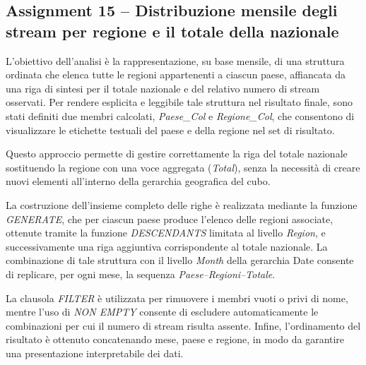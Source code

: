 \subsection*{Assignment 15 -- Distribuzione mensile degli stream per regione e il totale della nazionale}

L’obiettivo dell'analisi è la rappresentazione, su base mensile, di una struttura ordinata che
elenca tutte le regioni appartenenti a ciascun paese, affiancata da una riga
di sintesi per il totale nazionale e del relativo numero di
stream osservati. Per rendere esplicita e leggibile tale struttura nel risultato
finale, sono stati definiti due membri calcolati,
\textit{Paese\_Col} e \textit{Regione\_Col}, che consentono di visualizzare
 le etichette testuali del paese e della regione nel set di risultato.

Questo approccio permette di gestire correttamente la riga del totale
nazionale sostituendo la regione con una voce aggregata (\textit{Total}), senza
la necessità di creare nuovi elementi all’interno della gerarchia geografica del
cubo.

La costruzione dell’insieme completo delle righe è realizzata mediante la funzione
\textit{GENERATE}, che per ciascun paese produce l’elenco delle regioni
associate, ottenute tramite la funzione \textit{DESCENDANTS} limitata al livello
\textit{Region}, e successivamente una riga aggiuntiva corrispondente al totale
nazionale. La combinazione di tale struttura con il livello \textit{Month} della
gerarchia Date consente di replicare, per ogni mese, la sequenza
\emph{Paese–Regioni–Totale}.

La clausola \textit{FILTER} è utilizzata per rimuovere i membri vuoti o
privi di nome, mentre l’uso di \textit{NON EMPTY} consente di escludere
automaticamente le combinazioni per cui il numero di stream risulta assente.
Infine, l’ordinamento del risultato è ottenuto concatenando mese, paese e regione,
in modo da garantire una presentazione interpretabile dei dati.
